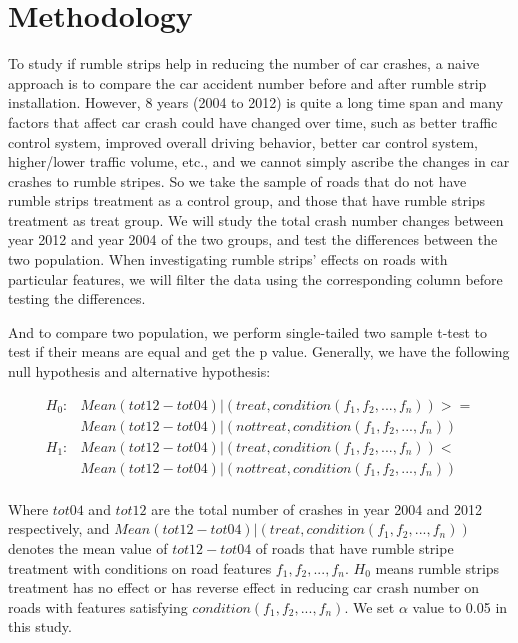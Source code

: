 \documentclass{article}
\begin{document}
\section*{Methodology}

To study if rumble strips help in reducing the number of car crashes, a naive approach is to compare the car accident number before and after rumble strip installation. However, 8 years (2004 to 2012) is quite a long time span and many factors that affect car crash could have changed over time, such as better traffic control system, improved overall driving behavior, better car control system, higher/lower traffic volume, etc., and we cannot simply ascribe the changes in car crashes to rumble stripes. So we take the sample of roads that do not have rumble strips treatment as a control group, and those that have rumble strips treatment as treat group. We will study the total crash number changes between year 2012 and year 2004 of the two groups, and test the differences between the two population. When investigating rumble strips' effects on roads with particular features, we will filter the data using the corresponding column before testing the differences. 

And to compare two population, we perform single-tailed two sample t-test to test if their means are equal and get the p value\cite{t-test}. Generally, we have the following null hypothesis and alternative hypothesis:

\begin{align*}
    H_0: &Mean(tot12-tot04)|(treat, condition(f_1, f_2, ..., f_n)) >= \\
         &Mean(tot12-tot04)|(not treat, condition(f_1, f_2, ..., f_n))\\
    H_1: &Mean(tot12-tot04)|(treat, condition(f_1, f_2, ..., f_n)) < \\
         &Mean(tot12-tot04)|(not treat, condition(f_1, f_2, ..., f_n))\\
\end{align*}

Where $tot04$ and $tot12$ are the total number of crashes in year 2004 and 2012 respectively, and $Mean(tot12-tot04)|(treat, condition(f_1, f_2, ..., f_n))$ denotes the mean value of $tot12-tot04$ of roads that have rumble stripe treatment with conditions on road features $f_1, f_2, ..., f_n$. $H_0$ means rumble strips treatment has no effect or has reverse effect in reducing car crash number on roads with features satisfying $condition(f_1, f_2, ..., f_n)$. We set $\alpha$ value to 0.05 in this study.
\end{document}

